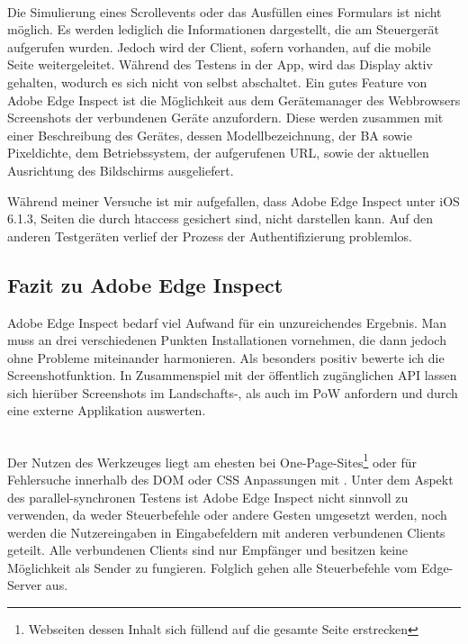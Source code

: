 		\\Die Simulierung eines Scrollevents oder das Ausfüllen eines Formulars ist nicht möglich. Es werden lediglich die Informationen dargestellt, die am Steuergerät aufgerufen wurden. Jedoch wird der Client, sofern vorhanden, auf die mobile Seite weitergeleitet. Während des Testens in der \Gls{App}, wird das Display aktiv gehalten, wodurch es sich nicht von selbst abschaltet. Ein gutes Feature von Adobe Edge Inspect ist die Möglichkeit aus dem Gerätemanager des \Gls{Webbrowser}s Screenshots der verbundenen Geräte anzufordern. Diese werden zusammen mit einer Beschreibung des Gerätes, dessen Modellbezeichnung, der \Gls{BA} sowie \Gls{Pixel}dichte, dem Betriebssystem, der aufgerufenen URL, sowie der aktuellen Ausrichtung des Bildschirms ausgeliefert.
		
		Während meiner Versuche ist mir aufgefallen, dass Adobe Edge Inspect unter iOS 6.1.3, Seiten die durch \gls{htaccess} 				gesichert sind, nicht darstellen kann. Auf den anderen Testgeräten verlief der Prozess der Authentifizierung problemlos. 
		
		\pagebreak
		\subsection{Fazit zu Adobe Edge Inspect}
		Adobe Edge Inspect bedarf viel Aufwand für ein unzureichendes Ergebnis. Man muss an drei verschiedenen Punkten Installationen vornehmen, die dann jedoch \mbox{ohne} Probleme miteinander harmonieren. Als besonders positiv bewerte ich die Screenshotfunktion. In Zusammenspiel mit der öffentlich zugänglichen API lassen sich hierüber Screenshots im Landschafts-, als auch im \Gls{PoW} anfordern und durch eine externe \Gls{App}likation auswerten. 
		
		\\Der Nutzen des Werkzeuges liegt am ehesten bei One-Page-Sites\footnote{Webseiten dessen Inhalt sich füllend auf die gesamte Seite erstrecken} oder für Fehlersuche innerhalb des \Gls{DOM} oder CSS Anpassungen mit . Unter dem Aspekt des \gls{parallel-synchron}en Testens ist Adobe Edge Inspect nicht sinnvoll zu verwenden, da weder Steuerbefehle oder andere Gesten umgesetzt werden, noch werden die Nutzereingaben in Eingabefeldern mit anderen verbundenen Clients geteilt. Alle verbundenen Clients sind nur Empfänger und besitzen keine Möglichkeit als Sender zu fungieren. Folglich gehen alle Steuerbefehle vom Edge-Server aus.
	
